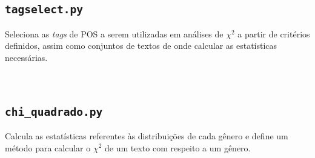 \documentclass[10pt,a4paper,onecolumn]{article}
\theoremstyle{definition}
\theoremstyle{remark}
\begin{document}
\break

\subsection{\texttt{tagselect.py}}\label{ap:tagselect}
\noindent
Seleciona as \emph{tags} de POS a serem utilizadas em análises de $\chi^2$ a partir de critérios definidos, assim como conjuntos de textos de onde calcular as estatísticas necessárias.

\

\break

\subsection{\texttt{chi\_quadrado.py}}
\noindent
Calcula as estatísticas referentes às distribuições de cada gênero e define um método para calcular o $\chi^2$ de um texto com respeito a um gênero.

\

%
\end{document}
